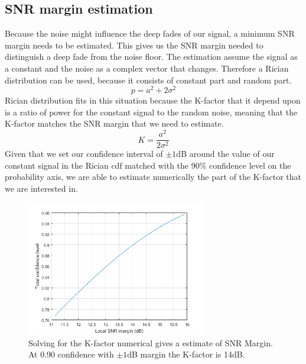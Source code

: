 \subsection{SNR margin estimation}
\label{SNR_margin}
Because the noise might influence the deep fades of our signal, a minimum SNR margin needs to be estimated.
This gives us the SNR margin needed to distinguish a deep fade from the noise floor. %
The estimation assume the signal as a constant and the noise as a complex vector that changes. Therefore a Rician distribution can be used, because it consists of constant part and random part.
\begin{equation}
p = a^2 + 2\sigma^2
\end{equation}
Rician distribution fits in this situation because the K-factor that it depend upon is a ratio of power for the constant signal to the random noise, \citep{SpaceWirelessChan} meaning that the K-factor matches the SNR margin that we need to estimate.
\begin{equation}
K = \frac{a^2}{2\sigma^2}
\end{equation}
Given that we set our confidence interval of $\pm 1$dB around the value of our constant signal in the Rician cdf matched with the 90\% confidence level on the probability axis, we are able to estimate numerically the part of the K-factor that we are interested in.
\begin{figure}[H]
\centering
\includegraphics[width=0.70\textwidth]{figures/SNR_margin.png}
\caption{Solving for the K-factor numerical gives a estimate of SNR Margin. At 0.90 confidence with $\pm 1$dB margin  the K-factor is 14dB.}
\label{Rician_90}
\end{figure}

